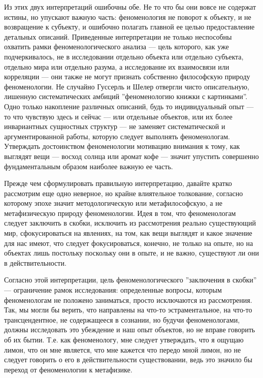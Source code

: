 \documentclass[11pt]{book}
\begin{document}
Из этих двух интерпретаций ошибочны обе. Не то что бы они вовсе не содержат истины, но упускают важную часть: феноменология не поворот к объекту, и не возвращение к субъекту, и ошибочно полагать главной ее целью предоставление детальных описаний. Приведенные интерпретации не только неспособны охватить рамки феноменологического анализа --- цель которого, как уже подчеркивалось, не в исследовании отдельно объекта или отдельно субъекта, отдельно мира или отдельно разума, а исследование их взаимосвязи или корреляции --- они также не могут признать собственно философскую природу феноменологии. Не случайно Гуссерль и Шелер отвергли чисто описательную, лишенную систематических амбиций ''феноменологию книжки с картинками''. Одно только накопление различных описаний, будь то индивидуальный опыт --- то что чувствую здесь и сейчас --- или отдельные объектов, или их более инвариантных сущностных структур --- не заменяет систематической и аргументированной работы, которую следует выполнять феноменологам. Утверждать достоинством феноменологии мотивацию внимания к тому, как выглядят вещи --- восход солнца или аромат кофе --- значит упустить совершенно фундаментальным образом наиболее важную ее часть.

Прежде чем сформулировать правильную интерпретацию, давайте кратко рассмотрим еще одно неверное, но крайне влиятельное толкование, согласно которому эпохе значит методологическую или метафилософскую, а не метафизическую природу феноменологии. Идея в том, что феноменологам следует заключить в скобки, исключить из рассмотрения реально существующий мир, сфокусироваться на явлениях, на том, как вещи выглядят и какое значение для нас имеют, что следует фокусироваться, конечно, не только на опыте, но на объектах лишь постольку поскольку они в опыте, и не важно, существуют ли они в действительности.

Согласно этой интерпретации, цель феноменологического ''заключения в скобки'' --- ограничение рамок исследования: определенные вопросы, которым феноменологам не положено заниматься, просто исключаются из рассмотрения. Так, мы могли бы верить, что направлены на что-то эстраментальное, на что-то трансцендентное, не содержащееся в сознании, но будучи феноменологами, должны исследовать это убеждение и наш опыт объектов, но не вправе говорить об их бытии. Т.е. как феноменологу, мне следует утверждать, что я ощущаю лимон, что он мне является, что мне кажется что передо мной лимон, но не следует говорить о его в действительности существовании, ведь это значило бы переход от феноменологии к метафизике.
\end{document}
